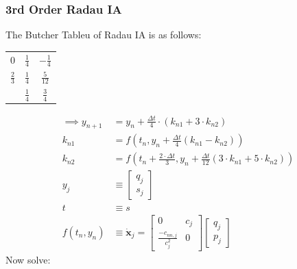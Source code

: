 \documentclass{article}
\begin{document}
\subsubsection{3rd Order Radau IA}
The Butcher Tableu of Radau IA is as follows:
\begin{center}
  \begin{tabular}{c|c c}
    $0$ & $\frac{1}{4}$ & $-\frac{1}{4}$ \\
    $\frac{2}{3}$ & $\frac{1}{4}$ & $\frac{5}{12}$ \\
    \hline
                & $\frac{1}{4}$ & $\frac{3}{4}$
  \end{tabular}
\end{center}
\begin{align*}
  \implies y_{n+1} &= y_{n} + \frac{\Delta t}{4}\cdot (k_{n1} + 3\cdot k_{n2})\\
  k_{n1} &= f\left(t_n, y_n + \frac{\Delta t}{4}({k_{n1} - k_{n2}})\right) \\
  k_{n2} &= f\left(t_n + \frac{2\cdot\Delta t}{3}, y_n + \frac{\Delta t}{12}({3\cdot k_{n1} + 5\cdot k_{n2}})\right) \\
  y_{j}&\equiv\begin{bmatrix}q_j \\ s_j \end{bmatrix} \\
  t&\equiv s\\
  f(t_n, y_n)&\equiv \dot{\bm{x}}_j=\begin{bmatrix} 0 & c_j \\ \frac{-c_{nn, j}}{c^2_j} & 0\end{bmatrix}\begin{bmatrix} q_j \\ p_j\end{bmatrix}
\end{align*}
Now solve:
\end{document}
